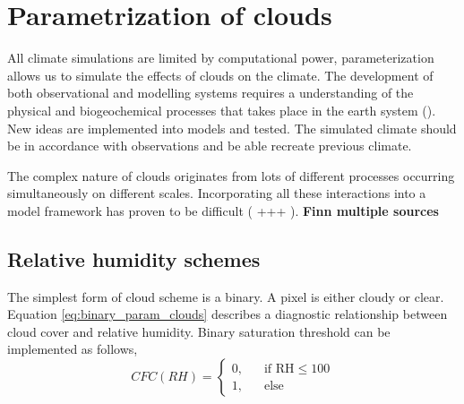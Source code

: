 \section{Parametrization of clouds} \label{sec:param_clouds}
All climate simulations are limited by computational power, parameterization allows us to simulate the effects of clouds on the climate. The development of both observational and modelling systems requires a understanding of the physical and biogeochemical processes that takes place in the earth system (\cite{Simmons2016Observation2016-2025}). New ideas are implemented into models and tested. The simulated climate should be in accordance with observations and be able recreate previous climate. 

The complex nature of clouds originates from lots of different processes occurring simultaneously on different scales. Incorporating all these interactions into a model framework has proven to be difficult (\cite{IPCC_CH9_climate_models} +++ ). \textbf{Finn multiple sources} 





\subsection{Relative humidity schemes}
The simplest form of cloud scheme is a binary. A pixel is either cloudy or clear. Equation \eqref{eq:binary_param_clouds} describes a diagnostic relationship between cloud cover and relative humidity. Binary saturation threshold can be implemented as follows,
\begin{equation} \label{eq:binary_param_clouds}
    CFC\left(RH\right) = 
     \begin{cases}
       \text{0,} &\quad\text{if RH}\le100\\
       \text{1,} &\quad\text{else}
     \end{cases}
\end{equation}

